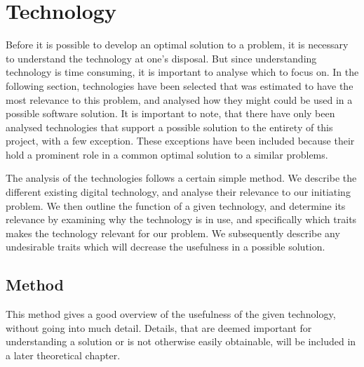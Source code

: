 
\section{Technology} \label{tech}


Before it is possible to develop an optimal solution to a problem, it is necessary to understand the technology at one's disposal. But since understanding technology is time consuming, it is important to analyse which to focus on. In the following section, technologies have been selected that was estimated to have the most relevance to this problem, and analysed how they might could be used in a possible software solution. It is important to note, that there have only been analysed technologies that support a possible solution to the entirety of this project, with a few exception. These exceptions have been included because their hold a prominent role in a common optimal solution to a similar problems.

The analysis of the technologies follows a certain simple method. We describe the different existing digital technology, and analyse their relevance to our initiating problem. We then outline the function of a given technology, and determine its relevance by examining why the technology is in use, and specifically which traits makes the technology relevant for our problem. We subsequently describe any undesirable traits which will decrease the usefulness in a possible solution.

\subsection{Method} \label{sub:techmethod}
This method gives a good overview of the usefulness of the given technology, without going into much detail. Details, that are deemed important for understanding a solution or is not otherwise easily obtainable, will be included in a later theoretical chapter.




